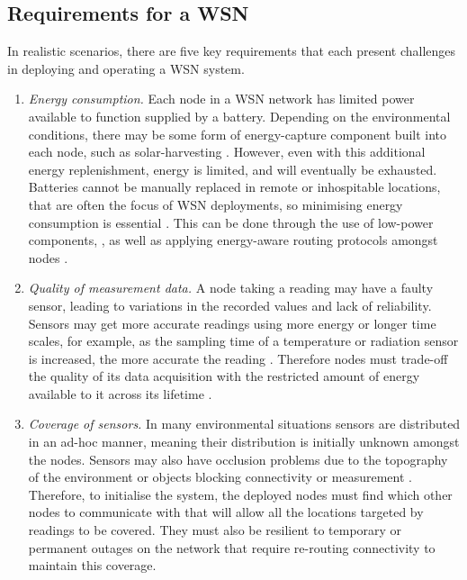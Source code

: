 \subsection{Requirements for a WSN}
In realistic scenarios, there are five key requirements that each present challenges in deploying and operating a WSN system.
\begin{enumerate}
\item \label{requirement:energy}\textit{Energy consumption.} Each node in a WSN network has limited power available to function supplied by a battery. Depending on the environmental conditions, there may be some form of energy-capture component built into each node, such as solar-harvesting \citep{Prauzek2018}. However, even with this additional energy replenishment, energy is limited, and will eventually be exhausted. Batteries cannot be manually replaced in remote or inhospitable locations, that are often the focus of WSN deployments, so minimising energy consumption is essential \citep{Anastasi2009}. This can be done through the use of low-power components, \citep{4772585, 8108667}, as well as applying energy-aware routing protocols amongst nodes \citep{s90100445}. 

\item \label{requirement:quality} \textit{Quality of measurement data.} A node taking a reading may have a faulty sensor, leading to variations in the recorded values and lack of reliability. Sensors may get more accurate readings using more energy or longer time scales, for example, as the sampling time of a temperature or radiation sensor is increased, the more accurate the reading \citep{s17061221}. Therefore nodes must trade-off the quality of its data acquisition with the restricted amount of energy available to it across its lifetime \citep{7845391}.

\item \label{requirement:coverage} \textit{Coverage of sensors.} In many environmental situations sensors are distributed in an ad-hoc manner, meaning their distribution is initially unknown amongst the nodes. Sensors may also have occlusion problems due to the topography of the environment or objects blocking connectivity or measurement \citep{10.1007/978-3-540-69170-9_23}. Therefore, to initialise the system, the deployed nodes must find which other nodes to communicate with that will allow all the locations targeted by readings to be covered. They must also be resilient to temporary or permanent outages on the network that require re-routing connectivity to maintain this coverage.


\end{enumerate}

